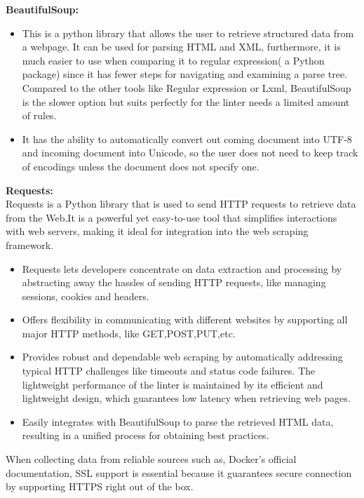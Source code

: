 \textbf{BeautifulSoup:}
\begin{itemize}
    \item This is a python library that allows the user to retrieve structured data from a webpage. It can be used for parsing HTML and XML, furthermore, it is much easier to use when comparing it to regular expression( a Python package) since it has fewer steps for navigating and examining a parse tree. Compared to the other tools like Regular expression or Lxml, BeautifulSoup is the slower option but suits perfectly for the linter needs a limited amount of rules. 
    \item It has the ability to automatically convert out coming document into UTF-8 and incoming document into Unicode, so the user does not need to keep track of encodings unless the document does not specify one. \cite{webscraping}
\end{itemize}
\textbf{Requests:}
\\Requests is a Python library that is used to send HTTP requests to retrieve data from the Web.It is a powerful yet easy-to-use tool that simplifies interactions with web servers, making it ideal for integration into the web scraping framework. \cite{pypy_2024}
\begin{itemize}
    \item Requests lets developers concentrate on data extraction and processing by abstracting away the hassles of sending HTTP requests, like managing sessions, cookies and headers. 
    \item Offers flexibility in communicating with different websites by supporting all major HTTP methods, like GET,POST,PUT,etc. 
    \item Provides robust and dependable web scraping by automatically addressing typical HTTP challenges like timeouts and status code failures. The lightweight performance of the linter is maintained by its efficient and lightweight design, which guarantees low latency when retrieving web pages. 
    \item Easily integrates with BeautifulSoup to parse the retrieved HTML data, resulting in a unified process for obtaining best practices. 
\end{itemize}

When collecting data from reliable sources such as, Docker's official documentation, SSL support is essential because it guarantees secure connection by supporting HTTPS right out of the box.

